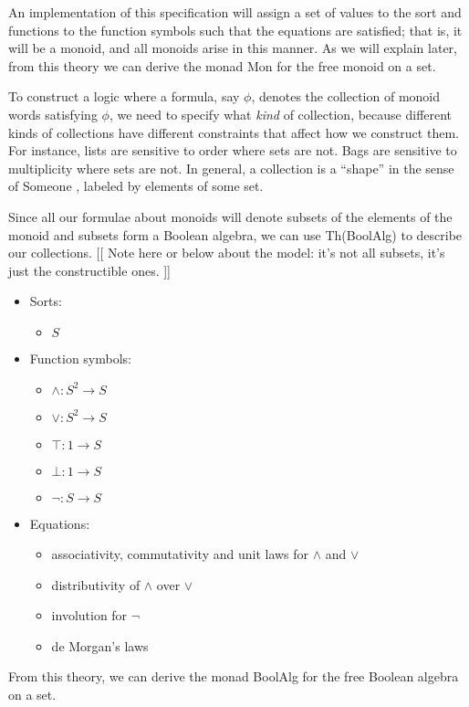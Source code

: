 \documentclass{article}
\newcommand{\maps}{\colon}
\begin{document}
An implementation of this specification will assign a set of values to the sort and functions to the function symbols such that the equations are satisfied; that is, it will be a monoid, and all monoids arise in this manner.  As we will explain later, from this theory we can derive the monad Mon for the free monoid on a set.

To construct a logic where a formula, say $\phi$, denotes the collection of monoid words satisfying $\phi$, we need to specify what \emph{kind} of collection, because different kinds of collections have different constraints that affect how we construct them. For instance, lists are sensitive to order where sets are not. Bags are sensitive to multiplicity where sets are not.  In general, a collection is a ``shape'' in the sense of Someone \cite{someone}, labeled by elements of some set.

Since all our formulae about monoids will denote subsets of the elements of the monoid and subsets form a Boolean algebra, we can use Th(BoolAlg) to describe our collections. [[ Note here or below about the model: it's not all subsets, it's just the constructible ones. ]]
\begin{center}
  \begin{itemize}
    \item Sorts:
    \begin{itemize}
      \item $S$
    \end{itemize}
    \item Function symbols:
    \begin{itemize}
      \item $\land\maps S^2 \to S$
      \item $\lor\maps S^2 \to S$
      \item $\top\maps 1 \to S$
      \item $\bot\maps 1 \to S$
      \item $\neg\maps S \to S$
    \end{itemize}
    \item Equations:
    \begin{itemize}
      \item associativity, commutativity and unit laws for $\land$ and $\lor$
      \item distributivity of $\land$ over $\lor$
      \item involution for $\neg$
      \item de Morgan's laws
    \end{itemize}
  \end{itemize}
\end{center}
From this theory, we can derive the monad BoolAlg for the free Boolean algebra on a set.
\end{document}
